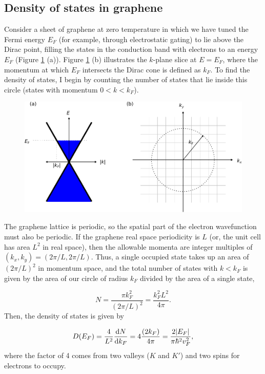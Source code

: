 \documentclass[double,12pt,1in]{beavtex}
\begin{document}

\subsection{Density of states in graphene}
Consider a sheet of graphene at zero temperature in which we have tuned the Fermi energy $E_F$ (for example, through electrostatic gating) to lie above the Dirac point, filling the states in the conduction band with electrons to an energy $E_F$ (Figure \ref{density of states graphic} (a)). Figure \ref{density of states graphic} (b) illustrates the $k$-plane slice at $E = E_F$, where the momentum at which $E_F$ intersects the Dirac cone is defined as $k_F$. To find the density of states, I begin by counting the number of states that lie inside this circle (states with momentum $0 < k < k_F$).

\begin{figure}
    \includegraphics{density of states graphic.pdf}
    \caption{}
    \label{density of states graphic}
\end{figure}
The graphene lattice is periodic, so the spatial part of the electron wavefunction must also be periodic. If the graphene real space periodicity is $L$ (or, the unit cell has area $L^2$ in real space), then the allowable momenta are integer multiples of $(k_x, k_y) = (2\pi/L, 2\pi/L)$. Thus, a single occupied state takes up an area of $(2\pi/L)^2$ in momentum space, and the total number of states with $k < k_F$ is given by the area of our circle of radius $k_F$ divided by the area of a single state,

\begin{equation}
    N = \frac{\pi k_F^2}{(2\pi/L)^2} = \frac{k_F^2 L^2}{4\pi}. 
\end{equation}
Then, the density of states is given by 

\begin{equation}
    D(E_F) = \frac{4}{L^2} \derivative{N}{k_F} = 4\frac{(2k_F)}{4 \pi} = \frac{2\abs{E_F}}{\pi \hbar^2 v_F^2}, \label{graphene DOS}
\end{equation}
where the factor of 4 comes from two valleys ($K$ and $K'$) and two spins for electrons to occupy. 
\end{document}
